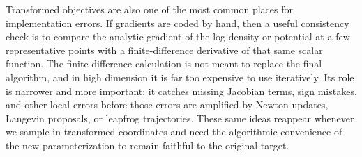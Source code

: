 Transformed objectives are also one of the most common places for implementation errors.
If gradients are coded by hand, then a useful consistency check is to compare the analytic gradient of the log density or potential at a few representative points with a finite-difference derivative of that same scalar function.
The finite-difference calculation is not meant to replace the final algorithm, and in high dimension it is far too expensive to use iteratively.
Its role is narrower and more important: it catches missing Jacobian terms, sign mistakes, and other local errors before those errors are amplified by Newton updates, Langevin proposals, or leapfrog trajectories.
These same ideas reappear whenever we sample in transformed coordinates and need the algorithmic convenience of the new parameterization to remain faithful to the original target.
